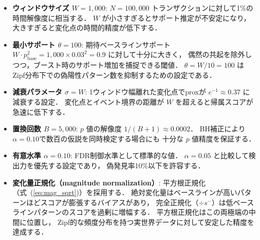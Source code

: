 \begin{itemize}
\item \textbf{ウィンドウサイズ $W = 1{,}000$}:
    $N = 100{,}000$ トランザクションに対して1\%の時間解像度に相当する．
    $W$ が小さすぎるとサポート推定が不安定になり，
    大きすぎると変化点の時間的精度が低下する．
\item \textbf{最小サポート $\theta = 100$}:
    期待ベースラインサポート
    $W \cdot p_{\text{base}}^2 = 1{,}000 \times 0.03^2 = 0.9$ に対して十分に大きく，
    偶然の共起を除外しつつ，ブースト時のサポート増加を捕捉できる閾値．
    $\theta = W / 10 = 100$ はZipf分布下での偽陽性パターン数を抑制するための設定である．
\item \textbf{減衰パラメータ $\sigma = W$}:
    1ウィンドウ幅離れた変化点でproxが $e^{-1} \approx 0.37$ に減衰する設定．
    変化点とイベント境界の距離が $W$ を超えると帰属スコアが急速に低下する．
\item \textbf{置換回数 $B = 5{,}000$}:
    $p$ 値の解像度 $1/(B+1) \approx 0.0002$．
    BH補正により$\alpha = 0.10$で数百の仮説を同時検定する場合にも
    十分な $p$ 値精度を保証する．
\item \textbf{有意水準 $\alpha = 0.10$}:
    FDR制御水準として標準的な値．
    $\alpha = 0.05$ と比較して検出力を優先する設定であり，
    偽発見率10\%以下を許容する．
\item \textbf{変化量正規化（magnitude normalization）}:
    平方根正規化（式~(\ref{eq:mag_sqrt})）を採用する．
    絶対変化量はベースラインが高いパターンほどスコアが膨張するバイアスがあり，
    完全正規化（$\div s^{-}$）は低ベースラインパターンのスコアを過剰に増幅する．
    平方根正規化はこの両極端の中間に位置し，
    Zipf的な頻度分布を持つ実世界データに対して安定した精度を達成する．
\end{itemize}
